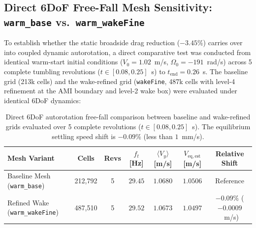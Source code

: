 \documentclass[11pt,a4paper]{article}
\begin{document}
\subsection{Direct 6DoF Free-Fall Mesh Sensitivity: \texttt{warm\_base} vs.\ \texttt{warm\_wakeFine}}
To establish whether the static broadside drag reduction ($-3.45\%$) carries over into coupled dynamic autorotation, a direct comparative test was conducted from identical warm-start initial conditions ($V_0 = 1.02$~m/s, $\Omega_0 = -191$~rad/s) across 5 complete tumbling revolutions ($t \in [0.08, 0.25]$~s) to $t_{\mathrm{end}} = 0.26$~s. The baseline grid (213k cells) and the wake-refined grid (\texttt{wakeFine}, 487k cells with level-4 refinement at the AMI boundary and level-2 wake box) were evaluated under identical 6DoF dynamics:

\begin{table}[htbp]
\centering
\small
\begin{tabularx}{\textwidth}{>{\raggedright\arraybackslash}X c c c c c c}
\toprule
\textbf{Mesh Variant} & \textbf{Cells} & \textbf{Revs} & \textbf{$f_t$ [Hz]} & \textbf{$\langle V_y \rangle$ [m/s]} & \textbf{$V_{\mathrm{eq,est}}$ [m/s]} & \textbf{Relative Shift} \\
\midrule
Baseline Mesh (\texttt{warm\_base}) & 212,792 & 5 & $29.45$ & $1.0680$ & $1.0506$ & Reference \\
Refined Wake (\texttt{warm\_wakeFine}) & 487,510 & 5 & $29.52$ & $1.0673$ & $1.0497$ & $\mathbf{-0.09\%}$ ($-0.0009$~m/s) \\
\bottomrule
\end{tabularx}
\caption{Direct 6DoF autorotation free-fall comparison between baseline and wake-refined grids evaluated over 5 complete revolutions ($t \in [0.08, 0.25]$~s). The equilibrium settling speed shift is $-0.09\%$ (less than $1$~mm/s).}
\label{tab:warm_wakefine}
\end{table}
\end{document}
